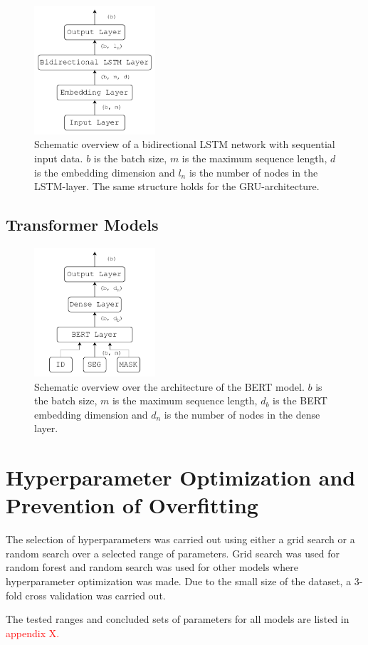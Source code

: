 \begin{figure}[ht]
    \centering
    \includegraphics[width=0.4\textwidth]{Figures/figs-bidir-lstm.pdf}
    \caption{Schematic overview of a bidirectional LSTM network with sequential input data. $b$ is the batch size, $m$ is the maximum sequence length, $d$ is the embedding dimension and $l_n$ is the number of nodes in the LSTM-layer. The same structure holds for the GRU-architecture.}
\end{figure}


\subsection{Transformer Models}



\begin{figure}[ht]
    \centering
    \includegraphics[width=0.4\textwidth]{Figures/figs-bert-ff.pdf}
    \caption{Schematic overview over the architecture of the BERT model. $b$ is the batch size, $m$ is the maximum sequence length, $d_b$ is the BERT embedding dimension and $d_n$ is the number of nodes in the dense layer.}
\end{figure}


\section{Hyperparameter Optimization and Prevention of Overfitting}

The selection of hyperparameters was carried out using either a grid search or a random search over a selected range of parameters. Grid search was used for random forest and random search was used for other models where hyperparameter optimization was made. Due to the small size of the dataset, a 3-fold cross validation was carried out. 

The tested ranges and concluded sets of parameters for all models are listed in \textcolor{red}{appendix X.}